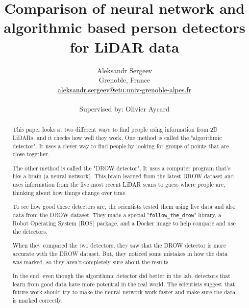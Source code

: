 \documentclass{article}
\title{
    Comparison of neural network and algorithmic based person detectors for LiDAR data
}
\author{
    Aleksandr Sergeev \\ 
    Grenoble, France \\
    \href{mailto:aleksandr.sergeev@etu.univ-grenoble-alpes.fr}{\textcolor{black}{aleksandr.sergeev@etu.univ-grenoble-alpes.fr}} \\
    \\
    Supervised by: Olivier Aycard
}
\begin{document}

\parbox[b]{\linewidth}{}

\begin{abstract}
	This paper looks at two different ways to find people using information from 2D LiDARs, and it checks how well they work.
	One method is called the "algorithmic detector".
	It uses a clever way to find people by looking for groups of points that are close together.

	The other method is called the "DROW detector".
	It uses a computer program that's like a brain (a neural network).
	This brain learned from the latest DROW dataset and uses information from the five most recent LiDAR scans to guess where people are, thinking about how things change over time.

	To see how good these detectors are, the scientists tested them using live data and also data from the DROW dataset.
	They made a special "\texttt{follow\_the\_drow}" library, a Robot Operating System (ROS) package, and a Docker image to help compare and use the detectors.

	When they compared the two detectors, they saw that the DROW detector is more accurate with the DROW dataset.
	But, they noticed some mistakes in how the data was marked, so they aren't completely sure about the results.

	In the end, even though the algorithmic detector did better in the lab, detectors that learn from good data have more potential in the real world.
	The scientists suggest that future work should try to make the neural network work faster and make sure the data is marked correctly.
\end{abstract}
\end{document}
